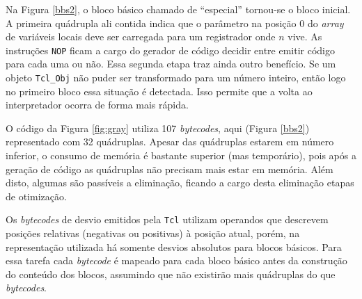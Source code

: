 Na Figura \ref{bbs2}, o bloco básico chamado de ``especial'' tornou-se
o bloco inicial. A primeira quádrupla ali contida indica que o
parâmetro na posição 0 do \textit{array} de variáveis locais deve ser
carregada para um registrador onde $n$ vive. As instruções \verb!NOP!
ficam a cargo do gerador de código decidir entre emitir código para
cada uma ou não. Essa segunda etapa traz ainda outro benefício. Se um
objeto \verb!Tcl_Obj! não puder ser transformado para um número
inteiro, então logo no primeiro bloco essa situação é detectada. Isso
permite que a volta ao interpretador ocorra de forma mais rápida.

O código da Figura \ref{fig:gray} utiliza 107 \textit{bytecodes}, aqui
(Figura \ref{bbs2}) representado com 32 quádruplas.
Apesar das quádruplas estarem em número inferior,
o consumo de memória é bastante superior (mas temporário), pois após
a geração de código as quádruplas não precisam mais estar em memória.
Além disto, algumas são passíveis a
eliminação, ficando a cargo desta eliminação etapas de otimização.

Os \textit{bytecodes} de desvio emitidos pela \texttt{Tcl} utilizam
operandos que descrevem posições relativas (negativas ou positivas) à
posição atual, porém, na
representação utilizada há somente desvios absolutos para blocos
básicos. Para essa tarefa cada
\textit{bytecode} é mapeado para cada bloco básico antes da construção do
conteúdo dos blocos, assumindo que não existirão mais quádruplas do que
\textit{bytecodes}.

